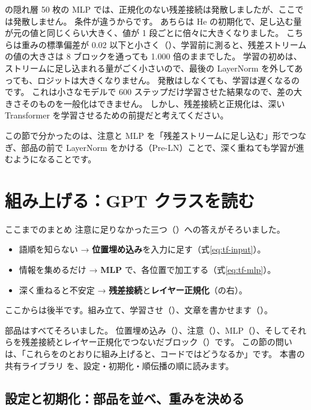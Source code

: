 の隠れ層 50 枚の MLP では、正規化のない残差接続は発散しましたが、ここでは発散しません。
条件が違うからです。
あちらは He の初期化で、足し込む量が元の値と同じくらい大きく、値が 1 段ごとに倍々に大きくなりました。
こちらは重みの標準偏差が 0.02 以下と小さく（）、学習前に測ると、残差ストリームの値の大きさは 8 ブロックを通っても 1.000 倍のままでした。
学習の初めは、ストリームに足し込まれる量がごく小さいので、最後の LayerNorm を外してあっても、ロジットは大きくなりません。
発散はしなくても、学習は遅くなるのです。
これは小さなモデルで 600 ステップだけ学習させた結果なので、差の大きさそのものを一般化はできません。
しかし、残差接続と正規化は、深い Transformer を学習させるための前提だと考えてください。

この節で分かったのは、注意と MLP を「残差ストリームに足し込む」形でつなぎ、部品の前で LayerNorm をかける（Pre-LN）ことで、深く重ねても学習が進むようになることです。

\section{組み上げる：GPT クラスを読む}\label{sec:tf-gpt}

\begin{intuition}{ここまでのまとめ}
注意に足りなかった三つ（）への答えがそろいました。
\begin{itemize}
\item 語順を知らない → \textbf{位置埋め込み}を入力に足す（式\eqref{eq:tf-input}）。
\item 情報を集めるだけ → \textbf{MLP} で、各位置で加工する（式\eqref{eq:tf-mlp}）。
\item 深く重ねると不安定 → \textbf{残差接続}と\textbf{レイヤー正規化}（の右）。
\end{itemize}
ここからは後半です。組み立て、学習させ（）、文章を書かせます（）。
\end{intuition}

部品はすべてそろいました。
位置埋め込み（）、注意（）、MLP（）、そしてそれらを残差接続とレイヤー正規化でつないだブロック（）です。
この節の問いは、「これらをのとおりに組み上げると、コードではどうなるか」です。
本書の共有ライブラリ  を、設定・初期化・順伝播の順に読みます。

\subsection*{設定と初期化：部品を並べ、重みを決める}

